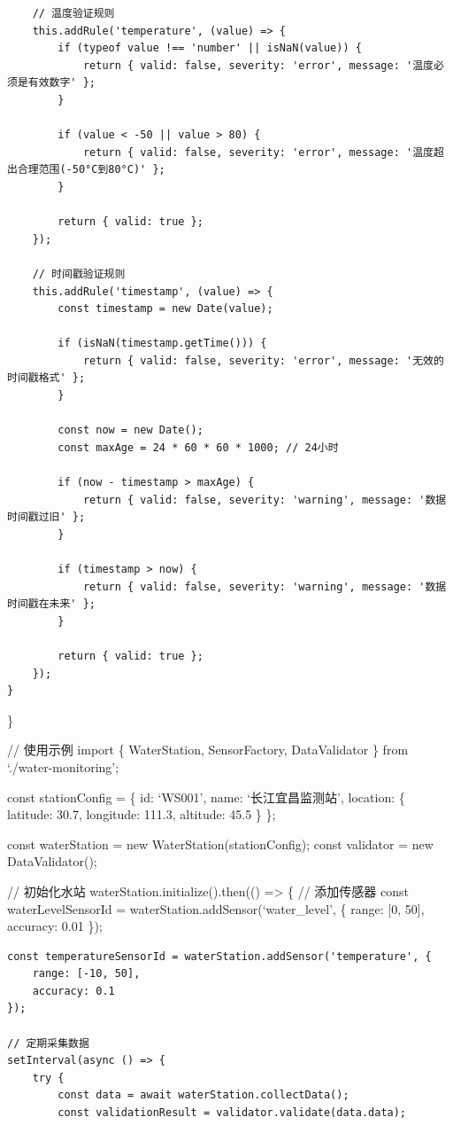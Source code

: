{{\begin{verbatim}
    // 温度验证规则
    this.addRule('temperature', (value) => {
        if (typeof value !== 'number' || isNaN(value)) {
            return { valid: false, severity: 'error', message: '温度必须是有效数字' };
        }
        
        if (value < -50 || value > 80) {
            return { valid: false, severity: 'error', message: '温度超出合理范围(-50°C到80°C)' };
        }
        
        return { valid: true };
    });
    
    // 时间戳验证规则
    this.addRule('timestamp', (value) => {
        const timestamp = new Date(value);
        
        if (isNaN(timestamp.getTime())) {
            return { valid: false, severity: 'error', message: '无效的时间戳格式' };
        }
        
        const now = new Date();
        const maxAge = 24 * 60 * 60 * 1000; // 24小时
        
        if (now - timestamp > maxAge) {
            return { valid: false, severity: 'warning', message: '数据时间戳过旧' };
        }
        
        if (timestamp > now) {
            return { valid: false, severity: 'warning', message: '数据时间戳在未来' };
        }
        
        return { valid: true };
    });
}
\end{verbatim}

\}

// 使用示例 import \{ WaterStation, SensorFactory, DataValidator \} from `./water-monitoring';

const stationConfig = \{ id: `WS001', name: `长江宜昌监测站', location: \{ latitude: 30.7, longitude: 111.3, altitude: 45.5 \} \};

const waterStation = new WaterStation(stationConfig); const validator = new DataValidator();

// 初始化水站 waterStation.initialize().then(() =\textgreater{} \{ // 添加传感器 const waterLevelSensorId = waterStation.addSensor(`water\_level', \{ range: {[}0, 50{]}, accuracy: 0.01 \});

\begin{verbatim}
const temperatureSensorId = waterStation.addSensor('temperature', {
    range: [-10, 50],
    accuracy: 0.1 
});

// 定期采集数据
setInterval(async () => {
    try {
        const data = await waterStation.collectData();
        const validationResult = validator.validate(data.data);
        

\end{verbatim}}}
